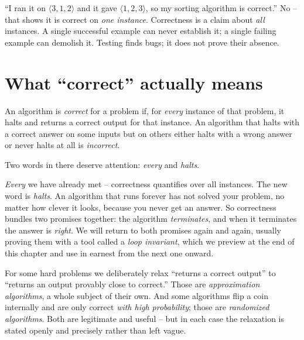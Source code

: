 \begin{trapbox}
``I ran it on $\langle 3, 1, 2 \rangle$ and it gave $\langle 1, 2, 3 \rangle$, so my
sorting algorithm is correct.'' No -- that shows it is correct on \emph{one
instance}. Correctness is a claim about \emph{all} instances. A single successful
example can never establish it; a single failing example can demolish it. Testing
finds bugs; it does not prove their absence.
\end{trapbox}

\section{What ``correct'' actually means}

\begin{definition}[Correctness]\label{ch01:correctness}
An algorithm is \emph{correct} for a problem if, for \emph{every} instance of that
problem, it halts and returns a correct output for that instance. An algorithm that
halts with a correct answer on some inputs but on others either halts with a wrong
answer or never halts at all is \emph{incorrect}.
\end{definition}

Two words in there deserve attention: \emph{every} and \emph{halts}.

\emph{Every} we have already met -- correctness quantifies over all instances. The
new word is \emph{halts}. An algorithm that runs forever has not solved your
problem, no matter how clever it looks, because you never get an answer. So
correctness bundles two promises together: the algorithm \emph{terminates}, and when
it terminates the answer is \emph{right}. We will return to both promises again and
again, usually proving them with a tool called a \emph{loop invariant}, which we
preview at the end of this chapter and use in earnest from the next one onward.

\begin{remark}\label{ch01:approximation}
For some hard problems we deliberately relax ``returns a correct output'' to
``returns an output provably close to correct.'' Those are \emph{approximation
algorithms}, a whole subject of their own. And some algorithms flip a coin
internally and are only correct \emph{with high probability}; those are
\emph{randomized algorithms}. Both are legitimate and useful -- but in each case the
relaxation is stated openly and precisely rather than left vague.
\end{remark}

